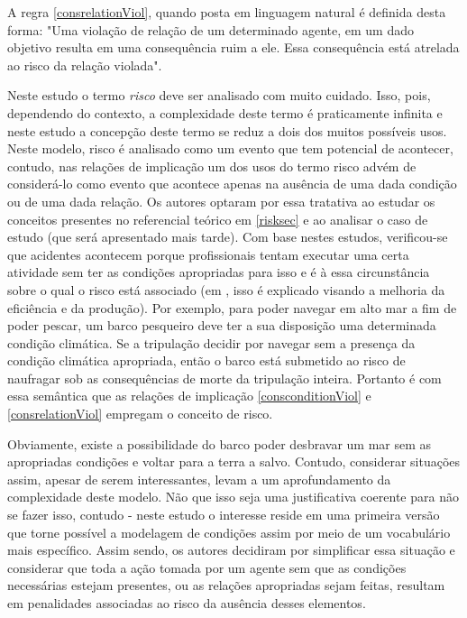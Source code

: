 A regra \ref{consrelationViol}, quando posta em linguagem natural é definida desta forma: "Uma violação de relação de um determinado agente, em um dado objetivo resulta em uma consequência ruim a ele. Essa consequência está atrelada ao risco da relação violada". 

Neste estudo o termo \textit{risco} deve ser analisado com muito cuidado. Isso, pois, dependendo do contexto, a complexidade deste termo é praticamente infinita e neste estudo a concepção deste termo se reduz a dois dos muitos possíveis usos. Neste modelo, risco é analisado como um evento que tem potencial de acontecer, contudo, nas relações de implicação um dos usos do termo risco advém de considerá-lo como evento que acontece apenas na ausência de uma dada condição ou de uma dada relação. Os autores optaram por essa tratativa ao estudar os conceitos presentes no referencial teórico em \ref{risksec} e ao analisar o caso de estudo (que será apresentado mais tarde). Com base nestes estudos, verificou-se que acidentes acontecem porque profissionais tentam executar uma certa atividade sem ter as condições apropriadas para isso e é à essa circunstância sobre o qual o risco está associado (em \cite{safety}, isso é explicado visando a melhoria da eficiência e da produção). Por exemplo, para poder navegar em alto mar a fim de poder pescar, um barco pesqueiro deve ter a sua disposição uma determinada condição climática. Se a tripulação decidir por navegar sem a presença da condição climática apropriada, então o barco está submetido ao risco de naufragar sob as consequências de morte da tripulação inteira. Portanto é com essa semântica que as relações de implicação \ref{consconditionViol} e \ref{consrelationViol} empregam o conceito de risco. 

Obviamente, existe a possibilidade do barco poder desbravar um mar sem as apropriadas condições e voltar para a terra a salvo. Contudo, considerar situações assim, apesar de serem interessantes, levam a um aprofundamento da complexidade deste modelo. Não que isso seja uma justificativa coerente para não se fazer isso, contudo - neste estudo o interesse reside em uma primeira versão que torne possível a modelagem de condições assim por meio de um vocabulário mais específico. Assim sendo, os autores decidiram por simplificar essa situação e considerar que toda a ação tomada por um agente sem que as condições necessárias estejam presentes, ou as relações apropriadas sejam feitas, resultam em penalidades associadas ao risco da ausência desses elementos.  

